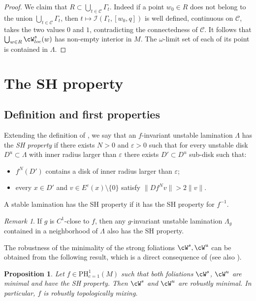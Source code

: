 \documentclass[a4paper,11pt]{amsart}
\numberwithin{equation}{section}     %
\def\cC{\mathcal{C}}  \def\cI{\mathcal{I}} \def\cO{\mathcal{O}} \def\cU{\mathcal{U}}
\newtheorem{prop}[teo]{Proposition}
\theoremstyle{definition}
\theoremstyle{remark}
\newtheorem{obs}[teo]{Remark}
\newcommand{\eps}{\varepsilon}
\begin{document}
\begin{proof}
We claim that $R \subset \bigcup_{t \in \cC} \Gamma_t$. Indeed if a point $w_0 \in R$ does not belong to the union $\bigcup_{t \in \cC} \Gamma_t$, then $t\mapsto  \cI(\Gamma_t, [w_0,q])$ is well defined, continuous on
$\cC$, takes the two values $0$ and $1$, contradicting the connectedness of $\cC$.
It follows that $\bigcup_{w \in R} \cW^{s}_{loc}(w)$ has non-empty interior in $M$. The $\omega$-limit set of each of its point is contained in $\Lambda$.
\end{proof}


\section{The SH property}\label{s-SH}

\subsection{Definition and first properties} 

Extending the definition of \cite{PS-SH}, we say that an $f$-invariant unstable lamination $\Lambda$ has the \emph{SH property} if there exists $N>0$ and $\eps>0$ such that for every unstable disk $D^u \subset \Lambda$ with inner radius larger than $\eps$ there exists $D' \subset D^u$ sub-disk such that:

\begin{itemize}
\item[--] $f^N(D')$ contains a disk of inner radius larger than $\eps$;
\item[--] every $x\in D'$ and $v \in E^c(x) \setminus \{0\}$ satisfy $\|Df^N v \| > 2 \|v\|$.
\end{itemize}
A stable lamination has the SH property if it has the SH property for $f^{-1}$.
\begin{obs}\label{r.SH-robust}
If $g$ is $C^1$-close to $f$, then any $g$-invariant unstable lamination $\Lambda_g$ contained in a neighborhood of $\Lambda$ also has the SH property.
\end{obs}

The robustness of the minimality of the strong foliations $\cW^s,\cW^u$ can be obtained from the following result, which is a direct consequence of \cite{PS-SH} (see also \cite{CroPot,ACW}).

\begin{prop}\label{prop-robustminimal}
Let $f \in \mathrm{PH}^1_{c=1}(M)$ such that both foliations $\cW^s$, $\cW^u$ are minimal and have the SH property. Then $\cW^s$ and $\cW^u$ are robustly minimal. In particular, $f$ is robustly topologically mixing.
\end{prop}
\end{document}
